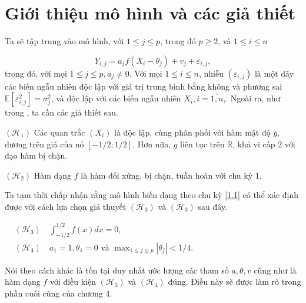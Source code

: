 
\chapter{Giới thiệu mô hình và các giả thiết}
Ta sẽ tập trung vào mô hình, với \(1 \leq j \leq p\), trong đó \(p \geq 2\), và \(1 \leq i \leq n\)

\[ Y_{i, j}=a_{j} f\left(X_{i}-\theta_{j}\right)+v_{j}+\varepsilon_{i, j} , \]
trong đó, với mọi \(1 \leq j \leq p, a_{j} \neq 0\). Với mọi \(1 \leq i \leq n\), nhiễu \(\left(\varepsilon_{i, j}\right)\) là một dãy các biến ngẫu nhiên độc lập với giá trị trung bình bằng không và phương sai \(\mathbb{E}\left[\varepsilon_{i, j}^{2}\right]=\sigma_{j}^{2}\), và độc lập với các biến ngẫu nhiên \(X_{i}, i=\overline{1,n}\),. Ngoài ra, như trong \cite{bercu}, ta cần các giả thiết sau.

$\left(\mathcal{H}_{1}\right)$ Các quan trắc $\left(X_{i}\right)$ là độc lập, cùng phân phối với hàm mật độ $g$, dương trên giá của nó $[-1 / 2 ; 1 / 2]$. Hơn nữa, $g$ liên tục trên $\mathbb{R}$, khả vi cấp 2 với đạo hàm bị chặn.

$\left(\mathcal{H}_{2}\right)$ Hàm dạng \(f\) là hàm đối xứng, bị chặn, tuần hoàn với chu kỳ 1.

Ta tạm thời chấp nhận rằng mô hình biến dạng theo chu kỳ \ref{1.1} có thể xác định được với cách lựa chọn giả thuyết $\left(\mathcal{H}_{3}\right)$ và $\left(\mathcal{H}_{3}\right)$ sau đây. 

$
\begin{aligned}
& \left(\mathcal{H}_{3}\right) \quad \int_{-1 / 2}^{1 / 2} f(x) d x=0 , \\
& \left(\mathcal{H}_{4}\right) \quad a_{1}=1, \theta_{1}=0 \text { và } \max _{1 \leq j \leq p}\left|\theta_{j}\right|<1 / 4 .
\end{aligned}
$

Nói theo cách khác là tồn tại duy nhất ước lượng các tham số \(a, \theta, v\) cũng như là hàm dạng \(f\) với điều kiện $\left(\mathcal{H}_{3}\right)$ và $\left(\mathcal{H}_{4}\right)$ đúng. Điều này sẽ được làm rõ trong phần cuối cùng của chương 4.


